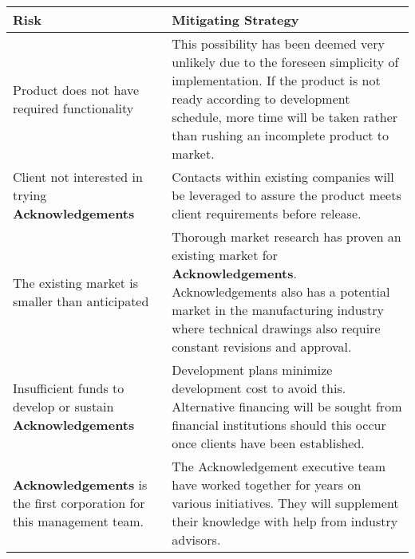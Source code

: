 \begin{center} \begin{tabular}{| p{2in} | p{4in} | }
    \hline
    {\bf Risk} & {\bf Mitigating Strategy} \\ \hline
	
	{Product does not have required functionality} & 
	{This possibility has been deemed very unlikely due to the foreseen simplicity of implementation. If the product is not ready according to development schedule, more time will be taken rather than rushing an incomplete product to market.} \\ \hline
	
	{\raggedright Client not interested in trying {\bf Acknowledgements}} & 
	{Contacts within existing companies will be leveraged to assure the product meets client requirements before release.} \\ \hline
	
	{The existing market is smaller than anticipated} & 
	{Thorough market research has proven an existing market for {\bf Acknowledgements}. Acknowledgements also has a potential market in the manufacturing industry where technical drawings also require constant revisions and approval.} \\ \hline
	
	{Insufficient funds to develop or sustain {\bf Acknowledgements}} & 
	{Development plans minimize development cost to avoid this. Alternative financing will be sought from financial institutions should this occur once clients have been established.} \\ \hline

	{{\bf Acknowledgements} is the first corporation for this management team.} & 
	{The Acknowledgement executive team have worked together for years on various initiatives. They will supplement their knowledge with help from industry advisors.} \\ \hline
\end{tabular} \end{center}